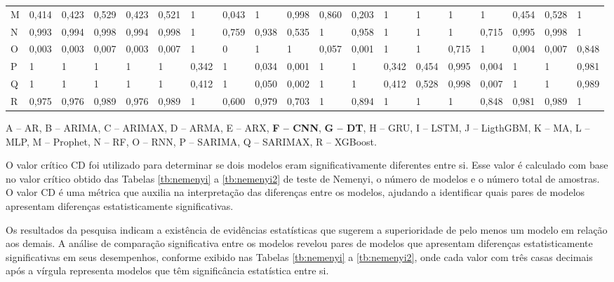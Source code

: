 \begin{landscape}
\begin{table}[!htb]
\begin{tabular}{@{}lllllllllllllllllll@{}}
M      & 0,414 & 0,423 & 0,529 & 0,423 & 0,521 & 1     & 0,043 & 1     & 0,998 & 0,860 & 0,203 & 1     & 1     & 1     & 1     & 0,454 & 0,528 & 1     \\
N      & 0,993 & 0,994 & 0,998 & 0,994 & 0,998 & 1     & 0,759 & 0,938 & 0,535 & 1     & 0,958 & 1     & 1     & 1     & 0,715 & 0,995 & 0,998 & 1     \\
O      & 0,003 & 0,003 & 0,007 & 0,003 & 0,007 & 1     & 0     & 1     & 1     & 0,057 & 0,001 & 1     & 1     & 0,715 & 1     & 0,004 & 0,007 & 0,848 \\
P      & 1     & 1     & 1     & 1     & 1     & 0,342 & 1     & 0,034 & 0,001 & 1     & 1     & 0,342 & 0,454 & 0,995 & 0,004 & 1     & 1     & 0,981 \\
Q      & 1     & 1     & 1     & 1     & 1     & 0,412 & 1     & 0,050 & 0,002 & 1     & 1     & 0,412 & 0,528 & 0,998 & 0,007 & 1     & 1     & 0,989 \\
R      & 0,975 & 0,976 & 0,989 & 0,976 & 0,989 & 1     & 0,600 & 0,979 & 0,703 & 1     & 0,894 & 1     & 1     & 1     & 0,848 & 0,981 & 0,989 & 1     \\ \bottomrule
\end{tabular}
	\vspace{2mm}
	
	\captionsetup{justification=centering} %
	A -- AR,
	B -- ARIMA,
	C -- ARIMAX,
	D -- ARMA,
	E -- ARX,
	\textbf{F -- CNN},
	\textbf{G -- DT},
	H -- GRU,
	I -- LSTM,
	J -- LigthGBM,
	K -- MA,
	L -- MLP,
	M -- Prophet,
	N -- RF,
	O -- RNN,
	P -- SARIMA,
	Q -- SARIMAX,
	R -- XGBoost.
	
\end{table}

\end{landscape}

O valor crítico CD foi utilizado para determinar se dois modelos eram significativamente diferentes entre si. Esse valor é calculado com base no valor crítico obtido das Tabelas \ref{tb:nemenyi} a \ref{tb:nemenyi2} de teste de Nemenyi, o número de modelos e o número total de amostras. O valor CD é uma métrica que auxilia na interpretação das diferenças entre os modelos, ajudando a identificar quais pares de modelos apresentam diferenças estatisticamente significativas.

Os resultados da pesquisa indicam a existência de evidências estatísticas que sugerem a superioridade de pelo menos um modelo em relação aos demais. A análise de comparação significativa entre os modelos revelou pares de modelos que apresentam diferenças estatisticamente significativas em seus desempenhos, conforme exibido nas Tabelas \ref{tb:nemenyi} a \ref{tb:nemenyi2}, onde cada valor com três casas decimais após a vírgula representa modelos que têm significância estatística entre si.

